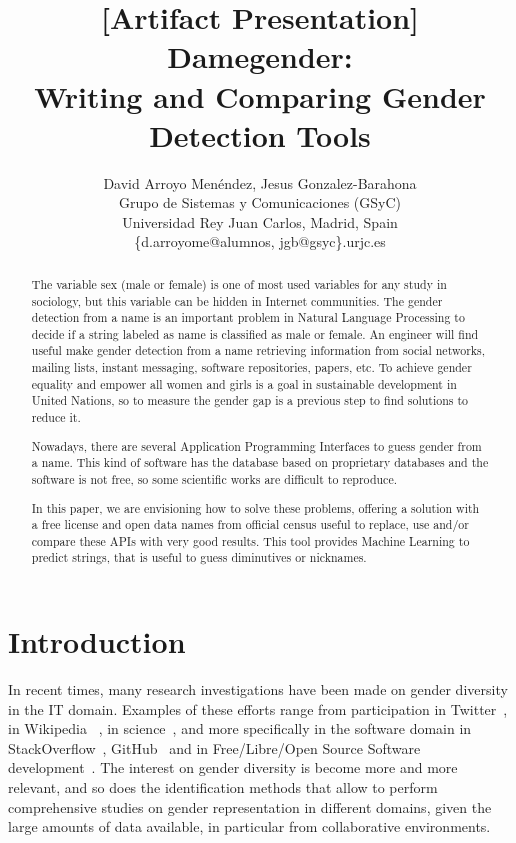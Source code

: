 \documentclass[a4paper]{article}
\title{[Artifact Presentation] Damegender: \\ Writing and Comparing Gender Detection Tools}
\author{
David Arroyo Men\'endez, Jesus Gonzalez-Barahona \\ Grupo de Sistemas y Comunicaciones (GSyC) \\ Universidad Rey Juan Carlos, Madrid, Spain \\ \{d.arroyome@alumnos, jgb@gsyc\}.urjc.es
}
\begin{document}
\maketitle

\begin{abstract}

The variable sex (male or female) is one of most used variables for
any study in sociology, but this variable can be hidden in Internet
communities. The gender detection from a name is an important problem
in Natural Language Processing to decide if a string labeled as name
is classified as male or female. An engineer will find useful
make gender detection from a name retrieving information from social
networks, mailing lists, instant messaging, software repositories,
papers, etc. To achieve gender equality and empower all women and
girls is a goal in sustainable development in United Nations, so to
measure the gender gap is a previous step to find solutions to reduce
it.

Nowadays, there are several Application Programming Interfaces to
guess gender from a name. This kind of software has the database
based on proprietary databases and the software is not free, so some
scientific works are difficult to reproduce.

In this paper, we are envisioning how to solve these problems,
offering a solution with a free license and open data names from
official census useful to replace, use and/or compare these APIs with
very good results. This tool provides Machine Learning to predict
strings, that is useful to guess diminutives or nicknames.
\end{abstract}


\section{Introduction}

In recent times, many research investigations have been made on gender
diversity in the IT domain.
Examples of these efforts range from participation in Twitter~\cite{burger2011discriminating,mislove2011understanding},
in Wikipedia ~\cite{antin2011gender,hill2013wikipedia}, in science~\cite{holman2018gender,dollar1999gender}, and more specifically in the software domain in StackOverflow~\cite{vasilescu2012gender}, GitHub~\cite{vasilescu2015gender} and in Free/Libre/Open Source Software development~\cite{robles2014floss}.
The interest on gender diversity is become more and more relevant, and so does the identification methods that allow to perform comprehensive studies on gender representation in different domains, given the large amounts of data available, in particular from collaborative environments.
\end{document}
